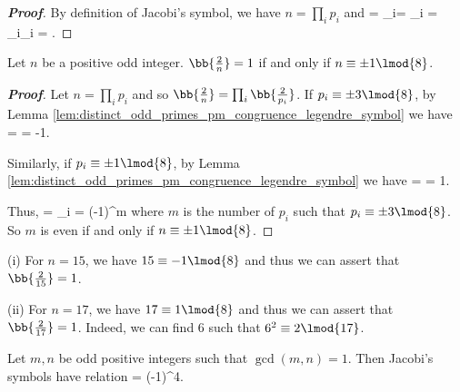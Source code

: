 \begin{proof}[\bf Proof]
By definition of Jacobi's symbol, we have $n = \prod_i p_i$ and
\be
{} = \prod_i= \prod_i = \prod_i\prod_i = .
\ee
\end{proof}

\begin{proposition}
Let $n$ be a positive odd integer. $\bb{\frac 2n}=1$ if and only if $n\equiv \pm 1\lmod{8}$.
\end{proposition}

\begin{proof}[\bf Proof]
Let $n = \prod_i p_i$ and so $\bb{\frac 2n} = \prod_i \bb{\frac 2{p_i}}$. If $p_i\equiv \pm 3\lmod{8}$, by Lemma \ref{lem:distinct_odd_primes_pm_congruence_legendre_symbol} we have
\be
{} =  = -1.
\ee

Similarly, if $p_i\equiv \pm 1\lmod{8}$, by Lemma \ref{lem:distinct_odd_primes_pm_congruence_legendre_symbol} we have
\be
{} =  = 1.
\ee

Thus, 
\be
{} = \prod_i  = (-1)^m
\ee
where $m$ is the number of $p_i$ such that $p_i \equiv \pm 3\lmod{8}$. So $m$ is even if and only if $n\equiv \pm 1\lmod{8}$.
\end{proof}

\begin{example}
\ben
\item [(i)] For $n = 15$, we have $15\equiv - 1\lmod{8}$ and thus we can assert that $\bb{\frac 2{15}} = 1$. %

\item [(ii)] For $n= 17$, we have $17\equiv 1\lmod{8}$ and thus we can assert that $\bb{\frac 2{17}} = 1$. Indeed, we can find 6 such that $6^2 \equiv 2 \lmod{17}$.
\een
\end{example}


\begin{theorem}\label{thm:law_of_quadratic_reciprocity_jacobi_symbol}
Let $m,n$ be odd positive integers such that $\gcd(m,n) = 1$. Then Jacobi's symbols have relation
\be
{} = (-1)^{4}.
\ee
\end{theorem}

